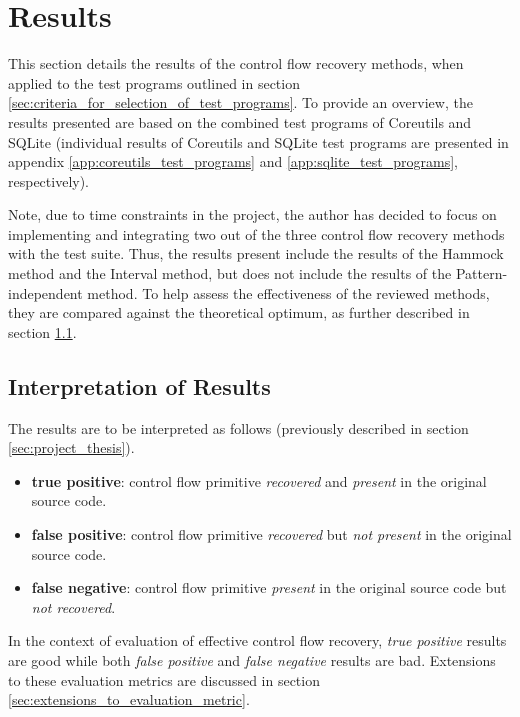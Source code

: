 
\section{Results}
\label{sec:results}

This section details the results of the control flow recovery methods, when applied to the test programs outlined in section \ref{sec:criteria_for_selection_of_test_programs}. To provide an overview, the results presented are based on the combined test programs of Coreutils and SQLite (individual results of Coreutils and SQLite test programs are presented in appendix \ref{app:coreutils_test_programs} and \ref{app:sqlite_test_programs}, respectively).

Note, due to time constraints in the project, the author has decided to focus on implementing and integrating two out of the three control flow recovery methods with the test suite. Thus, the results present include the results of the Hammock method and the Interval method, but does not include the results of the Pattern-independent method. To help assess the effectiveness of the reviewed methods, they are compared against the theoretical optimum, as further described in section \ref{sec:interpretation_of_results}.

\subsection{Interpretation of Results}
\label{sec:interpretation_of_results}

The results are to be interpreted as follows (previously described in section \ref{sec:project_thesis}).

\begin{itemize}
	\item \textbf{true positive}: control flow primitive \textit{recovered} and \textit{present} in the original source code.
	\item \textbf{false positive}: control flow primitive \textit{recovered} but \textit{not present} in the original source code.
	\item \textbf{false negative}: control flow primitive \textit{present} in the original source code but \textit{not recovered}.
\end{itemize}

In the context of evaluation of effective control flow recovery, \textit{true positive} results are good while both \textit{false positive} and \textit{false negative} results are bad. Extensions to these evaluation metrics are discussed in section \ref{sec:extensions_to_evaluation_metric}.

